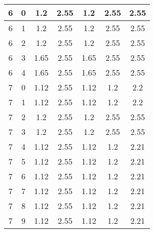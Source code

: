 \begin{longtable}{|c|c||c||c||c|c|c|}
	6 & 0 & 1.2 & 2.55 & 1.2 & 2.55 & 2.55 \\ \hline
	6 & 1 & 1.2 & 2.55 & 1.2 & 2.55 & 2.55 \\ \hline
	6 & 2 & 1.2 & 2.55 & 1.2 & 2.55 & 2.55 \\ \hline
	6 & 3 & 1.65 & 2.55 & 1.65 & 2.55 & 2.55 \\ \hline
	6 & 4 & 1.65 & 2.55 & 1.65 & 2.55 & 2.55 \\ \hline
	7 & 0 & 1.12 & 2.55 & 1.12 & 1.2 & 2.2 \\ \hline
	7 & 1 & 1.12 & 2.55 & 1.12 & 1.2 & 2.2 \\ \hline
	7 & 2 & 1.2 & 2.55 & 1.2 & 2.55 & 2.55 \\ \hline
	7 & 3 & 1.2 & 2.55 & 1.2 & 2.55 & 2.55 \\ \hline
	7 & 4 & 1.12 & 2.55 & 1.12 & 1.2 & 2.21 \\ \hline
	7 & 5 & 1.12 & 2.55 & 1.12 & 1.2 & 2.21 \\ \hline
	7 & 6 & 1.12 & 2.55 & 1.12 & 1.2 & 2.21 \\ \hline
	7 & 7 & 1.12 & 2.55 & 1.12 & 1.2 & 2.21 \\ \hline
	7 & 8 & 1.12 & 2.55 & 1.12 & 1.2 & 2.21 \\ \hline
	7 & 9 & 1.12 & 2.55 & 1.12 & 1.2 & 2.21 \\ \hline
\end{longtable}


